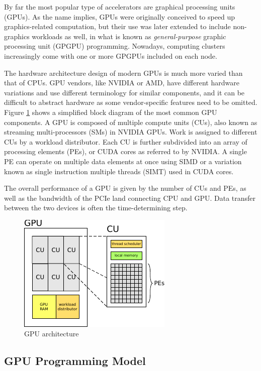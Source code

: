 By far the most popular type of accelerators are graphical processing units (GPUs). As the name implies, GPUs were originally conceived to speed up graphics-related computation, but their use was later extended to include non-graphics workloads as well, in what is known as \emph{general-purpose} graphic processing unit (GPGPU) programming. Nowadays, computing clusters increasingly come with one or more GPGPUs included on each node.

The hardware architecture design of modern GPUs is much more varied than that of CPUs. GPU vendors, like NVIDIA or AMD, have different hardware variations and use different terminology for similar components, and it can be difficult to abstract hardware as some vendor-specific features need to be omitted. Figure \ref{fig:gpu} shows a simplified block diagram of the most common GPU components. A GPU is composed of multiple compute units (CUs), also known as streaming multi-processors (SMs) in NVIDIA GPUs. Work is assigned to different CUs by a workload distributor. Each CU is further subdivided into an array of processing elements (PEs), or CUDA cores as referred to by NVIDIA. A single PE can operate on multiple data elements at once using SIMD or a variation known as single instruction multiple threads (SIMT) used in CUDA cores.

The overall performance of a GPU is given by the number of CUs and PEs, as well as the bandwidth of the PCIe land connecting CPU and GPU. Data transfer between the two devices is often the time-determining step.

\begin{figure}
\centering
\includegraphics[scale=2.0]{Pics/gpu}
\caption{GPU architecture}
\label{fig:gpu}
\end{figure}

\subsection{GPU Programming Model}

